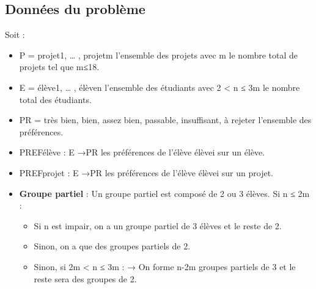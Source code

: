 \documentclass{article}
\begin{document}
\subsection{Données du problème}
Soit :
\begin{itemize}
  \item P = {projet1, … , projetm} l’ensemble des projets avec m le nombre total de projets tel que m≤18.
  \item E = {élève1, … , élèven} l’ensemble des étudiants avec 2 < n ≤ 3m le nombre total des étudiants.
  \item PR = {très bien, bien, assez bien, passable, insuffisant, à rejeter} l’ensemble des préférences.
  \item PREFélève       : 	E →PR    les préférences de l’élève élèvei sur un élève.
  \item PREFprojet      : 	E →PR  les préférences de l’élève élèvei sur un projet.
  \item \textbf{Groupe partiel} : Un groupe partiel est composé de 2 ou 3 élèves.
                Si n ≤ 2m :
                \begin{itemize}
                    \item Si n est impair, on a un groupe partiel de 3 élèves et le reste de 2.
                    \item Sinon, on a que des groupes partiels de 2.
                    \item Sinon, si 2m < n ≤ 3m :
                           → On forme n-2m groupes partiels de 3 et le reste sera des groupes de 2.
                \end{itemize}
                

\end{itemize}
\end{document}
